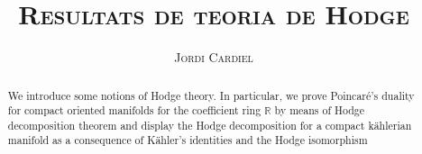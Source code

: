 \documentclass[compress]{article}
\title{\large{\textsc{\textbf{Resultats de teoria de Hodge}}}}
\author{\textsc{Jordi Cardiel}}
\date{}
\begin{document}
\maketitle
\begin{abstract}
    We introduce some notions of Hodge theory. In particular, we prove Poincaré's duality for compact oriented manifolds for the coefficient ring $\mathbb{R}$ by means of Hodge decomposition theorem and display the Hodge decomposition for a compact kählerian manifold as a consequence of Kähler's identities and the Hodge isomorphism
\end{abstract}
\tableofcontents
\,\newline


\printbibliography
\end{document}
